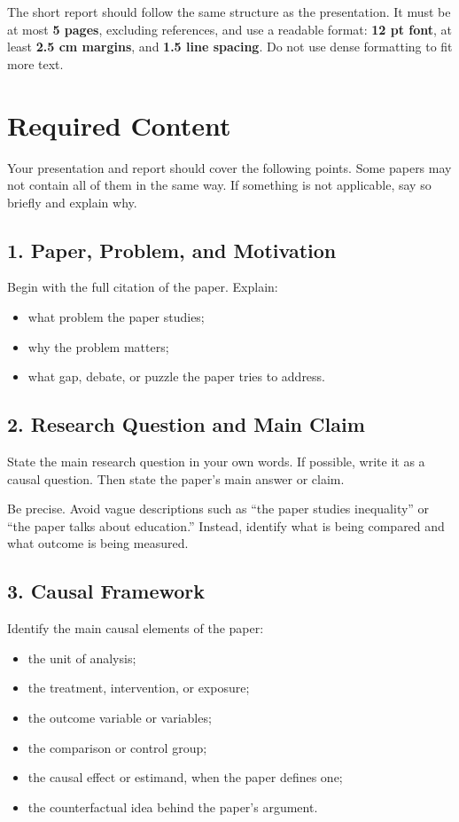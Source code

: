 \documentclass[12pt]{article}
\begin{document}
The short report should follow the same structure as the presentation. It must be at most \textbf{5 pages}, excluding references, and use a readable format: \textbf{12 pt font}, at least \textbf{2.5 cm margins}, and \textbf{1.5 line spacing}. Do not use dense formatting to fit more text.

\section*{Required Content}

Your presentation and report should cover the following points. Some papers may not contain all of them in the same way. 
If something is not applicable, say so briefly and explain why.

\subsection*{1. Paper, Problem, and Motivation}

Begin with the full citation of the paper. Explain:

\begin{itemize}
    \item what problem the paper studies;
    \item why the problem matters;
    \item what gap, debate, or puzzle the paper tries to address.
\end{itemize}

\subsection*{2. Research Question and Main Claim}

State the main research question in your own words. If possible, write it as a causal question. %
Then state the paper's main answer or claim.

Be precise. Avoid vague descriptions such as ``the paper studies inequality'' or ``the paper talks about education.'' Instead, identify what is being compared and what outcome is being measured.

\subsection*{3. Causal Framework}

Identify the main causal elements of the paper:

\begin{itemize}
    \item the unit of analysis;
    \item the treatment, intervention, or exposure;
    \item the outcome variable or variables;
    \item the comparison or control group;
    \item the causal effect or estimand, when the paper defines one;
    \item the counterfactual idea behind the paper's argument.
\end{itemize}
\end{document}
